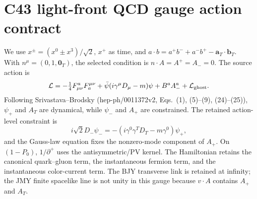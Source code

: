 \section*{C43 light-front QCD gauge action contract}
We use $x^\pm=(x^0\pm x^3)/\sqrt2$, $x^+$ as time, and
$a\cdot b=a^+b^-+a^-b^+-\boldsymbol a_T\cdot\boldsymbol b_T$.
With $n^\mu=(0,1,\boldsymbol0_T)$, the selected condition is
$n\cdot A=A^+=A_-=0$.  The source action is
\[\mathcal L=-\tfrac14F^a_{\mu\nu}F_a^{\mu\nu}+\bar\psi(i\gamma^\mu D_\mu-m)\psi+B^aA_-^a+\mathcal L_{\rm ghost}.\]
Following Srivastava--Brodsky (hep-ph/0011372v2, Eqs.~(1), (5)--(9),
(24)--(25)), $\psi_+$ and $A_T$ are dynamical, while $\psi_-$ and $A_+$
are constrained.  The retained action-level constraint is
\[i\sqrt2D_-\psi_-=-(i\gamma^0\gamma^TD_T-m\gamma^0)\psi_+,\]
and the Gauss-law equation fixes the nonzero-mode component of $A_+$.
On $(1-P_0)$, $1/\partial^+$ uses the antisymmetric/PV kernel.  The
Hamiltonian retains the canonical quark--gluon term, the instantaneous
fermion term, and the instantaneous color-current term.  The BJY transverse
link is retained at infinity; the JMY finite spacelike line is not unity in
this gauge because $v\cdot A$ contains $A_+$ and $A_T$.
